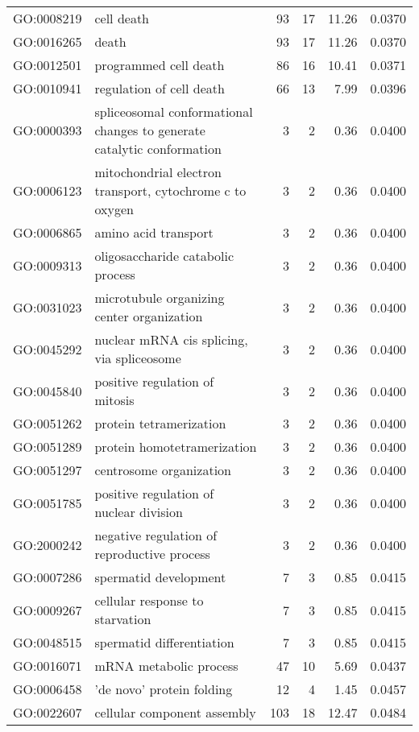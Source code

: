 \begin{longtable}{lp{4.5cm}rrrl}
  GO:0008219 & cell death &  93 &  17 & 11.26 & 0.0370 \\ 
  GO:0016265 & death &  93 &  17 & 11.26 & 0.0370 \\ 
  GO:0012501 & programmed cell death &  86 &  16 & 10.41 & 0.0371 \\ 
  GO:0010941 & regulation of cell death &  66 &  13 & 7.99 & 0.0396 \\ 
  GO:0000393 & spliceosomal conformational changes to generate catalytic conformation &   3 &   2 & 0.36 & 0.0400 \\ 
  GO:0006123 & mitochondrial electron transport, cytochrome c to oxygen &   3 &   2 & 0.36 & 0.0400 \\ 
  GO:0006865 & amino acid transport &   3 &   2 & 0.36 & 0.0400 \\ 
  GO:0009313 & oligosaccharide catabolic process &   3 &   2 & 0.36 & 0.0400 \\ 
  GO:0031023 & microtubule organizing center organization &   3 &   2 & 0.36 & 0.0400 \\ 
  GO:0045292 & nuclear mRNA cis splicing, via spliceosome &   3 &   2 & 0.36 & 0.0400 \\ 
  GO:0045840 & positive regulation of mitosis &   3 &   2 & 0.36 & 0.0400 \\ 
  GO:0051262 & protein tetramerization &   3 &   2 & 0.36 & 0.0400 \\ 
  GO:0051289 & protein homotetramerization &   3 &   2 & 0.36 & 0.0400 \\ 
  GO:0051297 & centrosome organization &   3 &   2 & 0.36 & 0.0400 \\ 
  GO:0051785 & positive regulation of nuclear division &   3 &   2 & 0.36 & 0.0400 \\ 
  GO:2000242 & negative regulation of reproductive process &   3 &   2 & 0.36 & 0.0400 \\ 
  GO:0007286 & spermatid development &   7 &   3 & 0.85 & 0.0415 \\ 
  GO:0009267 & cellular response to starvation &   7 &   3 & 0.85 & 0.0415 \\ 
  GO:0048515 & spermatid differentiation &   7 &   3 & 0.85 & 0.0415 \\ 
  GO:0016071 & mRNA metabolic process &  47 &  10 & 5.69 & 0.0437 \\ 
  GO:0006458 & 'de novo' protein folding &  12 &   4 & 1.45 & 0.0457 \\ 
  GO:0022607 & cellular component assembly & 103 &  18 & 12.47 & 0.0484 \\ 
  \hline

\end{longtable}
